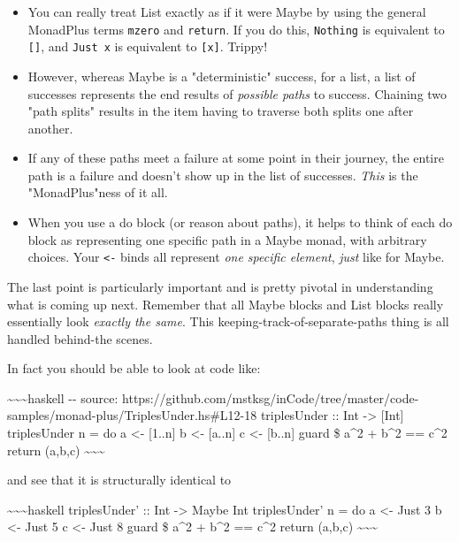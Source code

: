 \documentclass[]{article}
\begin{document}
\begin{itemize}
\tightlist
\item
  You can really treat List exactly as if it were Maybe by using the general
  MonadPlus terms \texttt{mzero} and \texttt{return}. If you do this,
  \texttt{Nothing} is equivalent to \texttt{{[}{]}}, and \texttt{Just\ x} is
  equivalent to \texttt{{[}x{]}}. Trippy!
\item
  However, whereas Maybe is a "deterministic" success, for a list, a list of
  successes represents the end results of \emph{possible paths} to success.
  Chaining two "path splits" results in the item having to traverse both splits
  one after another.
\item
  If any of these paths meet a failure at some point in their journey, the
  entire path is a failure and doesn't show up in the list of successes.
  \emph{This} is the "MonadPlus"ness of it all.
\item
  When you use a do block (or reason about paths), it helps to think of each do
  block as representing one specific path in a Maybe monad, with arbitrary
  choices. Your \texttt{\textless{}-} binds all represent \emph{one specific
  element}, \emph{just} like for Maybe.
\end{itemize}

The last point is particularly important and is pretty pivotal in understanding
what is coming up next. Remember that all Maybe blocks and List blocks really
essentially look \emph{exactly the same}. This keeping-track-of-separate-paths
thing is all handled behind-the scenes.

In fact you should be able to look at code like:

\textasciitilde{}\textasciitilde{}\textasciitilde{}haskell -\/- source:
https://github.com/mstksg/inCode/tree/master/code-samples/monad-plus/TriplesUnder.hs\#L12-18
triplesUnder :: Int -\textgreater{} {[}Int{]} triplesUnder n = do a \textless{}-
{[}1..n{]} b \textless{}- {[}a..n{]} c \textless{}- {[}b..n{]} guard \$ a\^{}2 +
b\^{}2 == c\^{}2 return (a,b,c)
\textasciitilde{}\textasciitilde{}\textasciitilde{}

and see that it is structurally identical to

\textasciitilde{}\textasciitilde{}\textasciitilde{}haskell triplesUnder' :: Int
-\textgreater{} Maybe Int triplesUnder' n = do a \textless{}- Just 3 b
\textless{}- Just 5 c \textless{}- Just 8 guard \$ a\^{}2 + b\^{}2 == c\^{}2
return (a,b,c) \textasciitilde{}\textasciitilde{}\textasciitilde{}
\end{document}
